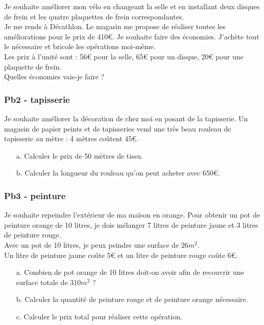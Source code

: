 Je souhaite améliorer mon vélo en changeant la selle et en installant deux disques de frein et les quatre plaquettes de frein correspondantes. \\

Je me rends à Décathlon. Le magasin me propose de réaliser toutes les améliorations pour le prix de 410€. Je souhaite faire des économies. J'achète tout le nécessaire et bricole les opérations moi-même. \\

Les prix à l'unité sont : 56€ pour la selle, 65€ pour un disque, 20€ pour une plaquette de frein.\\

Quelles économies vais-je faire ?

\subsubsection*{Pb2 - tapisserie}

Je souhaite améliorer la décoration de chez moi en posant de la tapisserie. Un magasin de papier peints et de tapisseries vend une très beau rouleau de tapisserie au mètre : 4 mètres coûtent 45€.

\begin{enumerate}
  \item[a.] Calculer le prix de 50 mètres de tissu.
  \item[b.] Calculer la longueur du rouleau qu'on peut acheter avec 650€.
\end{enumerate}  


\subsubsection*{Pb3 - peinture} 

Je souhaite repeindre l'extérieur de ma maison en orange. Pour obtenir un pot de peinture orange de 10 litres, je dois mélanger 7 litres de peinture jaune et 3 litres de peinture rouge.\\ 

Avec un pot de 10 litres, je peux peindre une surface de $26m^2$. \\

Un litre de peinture jaune coûte 5€ et un litre de peinture rouge coûte 6€. 

\begin{enumerate}
  \item[a.] Combien de pot orange de 10 litres doit-on avoir afin de recouvrir une surface totale de $310m^2$ ?
  \item[b.] Calculer la quantité de peinture rouge et de peinture orange nécessaire.
  \item[c.] Calculer le prix total pour réaliser cette opération.  
\end{enumerate}

